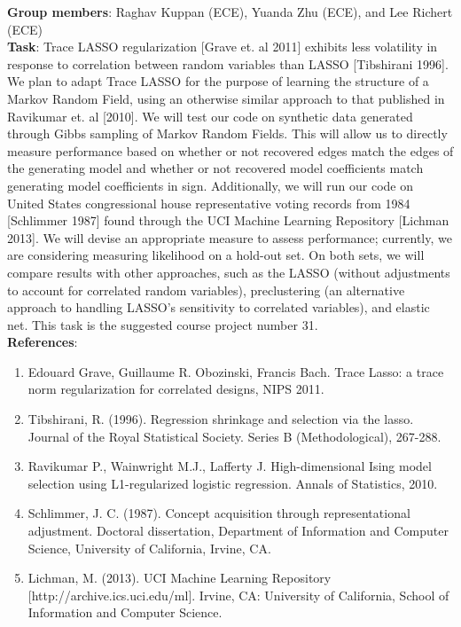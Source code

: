 \documentclass{article}
\begin{document}
\textbf{Group members}: Raghav Kuppan (ECE), Yuanda Zhu (ECE), and Lee Richert (ECE)\\

\textbf{Task}: Trace LASSO regularization [Grave et. al 2011] exhibits less volatility in response to correlation between random variables than LASSO [Tibshirani 1996].  We plan to adapt Trace LASSO for the purpose of learning the structure of a Markov Random Field, using an otherwise similar approach to that published in Ravikumar et. al [2010]. We will test our code on synthetic data generated through Gibbs sampling of Markov Random Fields. This will allow us to directly measure performance based on whether or not recovered edges match the edges of the generating model and whether or not recovered model coefficients match generating model coefficients in sign.  Additionally, we will run our code on United States congressional house representative voting records from 1984 [Schlimmer 1987] found through the UCI Machine Learning Repository [Lichman 2013]. We will devise an appropriate measure to assess performance; currently, we are considering measuring likelihood on a hold-out set. On both sets, we will compare results with other approaches, such as the LASSO (without adjustments to account for correlated random variables), preclustering (an alternative approach to handling LASSO's sensitivity to correlated variables), and elastic net. This task is the suggested course project number 31.\\


\textbf{References}:
\begin{enumerate}
\item
Edouard Grave, Guillaume R. Obozinski, Francis Bach. Trace Lasso: a trace norm 
regularization for correlated designs, NIPS 2011.

\item
Tibshirani, R. (1996). Regression shrinkage and selection via the lasso. Journal of the Royal Statistical Society. Series B (Methodological), 267-288.

\item
Ravikumar P., Wainwright M.J., Lafferty J. High-dimensional Ising model selection using L1-regularized logistic regression. Annals of Statistics, 2010.

\item
Schlimmer, J. C. (1987). Concept acquisition through representational adjustment. Doctoral dissertation, Department of Information and Computer Science, University of California, Irvine, CA.

\item
Lichman, M. (2013). UCI Machine Learning Repository [http://archive.ics.uci.edu/ml]. Irvine, CA: University of California, School of Information and Computer Science. 
\end{enumerate}
\end{document}
